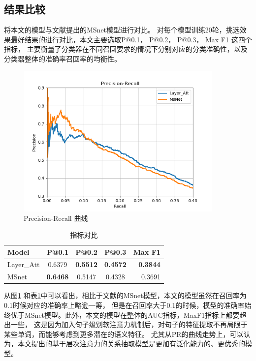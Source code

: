 \documentclass[UTF8]{csoarticle}
\begin{document}
\subsection{结果比较}
将本文的模型与文献\cite{bib10}提出的MSnet模型进行对比。
对每个模型训练20轮，挑选效果最好结果的进行对比，本文主要选取P@0.1， P@0.2， P@0.3， Max F1 这四个指标，
主要衡量了分类器在不同召回要求的情况下分别对应的分类准确性，以及分类器整体的准确率召回率的均衡性。

\begin{figure}[ht]
\centering
\includegraphics[width=0.9\textwidth]{pr_curve.png} 
\caption{Precision-Recall 曲线}
\label{fig:pr}
\end{figure}


\begin{table}
    \caption{指标对比}
    \label{tab:tab1}
    \centering
    \begin{tabular}{l||c|c|c|r|}
        \hline
        Model & P@0.1 & P@0.2 & P@0.3 & Max F1\\
        \hline
        Layer\_Att& 0.6379          & \textbf{0.5512}& \textbf{0.4572}& \textbf{0.3844} \\
        MSnet     & \textbf{0.6468} & 0.5147         & 0.4328          & 0.3691 \\
    \end{tabular}
\end{table}


从图\ref{fig:pr} 和表\ref{tab:tab1}中可以看出，相比于文献\cite{bib10}的MSnet模型，本文的模型虽然在召回率为0.1时候对应的准确率上略逊一筹，
但是在召回率大于0.1的时候，模型的准确率始终优于MSnet模型。此外，本文的模型在整体的AUC指标，MaxF1指标上都要超出一些，
这是因为加入句子级别软注意力机制后，对句子的特征提取不再局限于某些单词，而能够考虑到更多潜在的语义特征。
尤其从PR的曲线走势上，可以认为，本文提出的基于层次注意力的关系抽取模型是更加有泛化能力的、更优秀的模型。
\end{document}
